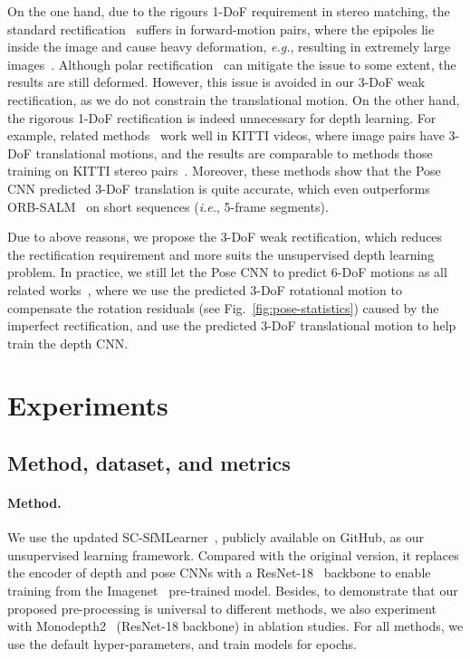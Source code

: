 \documentclass{article}
\newcommand{\figref}[1]{Fig.~\ref{#1}}
\def\eg{\emph{e.g.}}
\def\ie{\emph{i.e.}}
\begin{document}
On the one hand, due to the rigours 1-DoF requirement in stereo matching,
the standard rectification~\cite{fusiello2000compact} suffers in forward-motion pairs,
where the epipoles lie inside the image and cause heavy deformation, \eg, resulting in extremely large images~\cite{fusiello2000compact}.
Although polar rectification~\cite{pollefeys1999simple} can mitigate the issue to some extent,
the results are still deformed.
However, this issue is avoided in our 3-DoF weak rectification,
as we do not constrain the translational motion.
On the other hand, the rigorous 1-DoF rectification is indeed unnecessary for depth learning.
For example, related methods~\cite{zhou2017unsupervised,yin2018geonet,ranjan2019cc,monodepth2, bian2019depth} work well in KITTI videos,
where image pairs have 3-DoF translational motions,
and the results are comparable to methods those training on KITTI stereo pairs~\cite{garg2016unsupervised, godard2017unsupervised, zhan2018unsupervised}.
Moreover, these methods show that the Pose CNN predicted 3-DoF translation is quite accurate, which even outperforms ORB-SALM~\cite{mur2015orb} on short sequences (\ie, 5-frame segments).

Due to above reasons, we propose the 3-DoF weak rectification,
which reduces the rectification requirement and more suits the unsupervised depth learning problem.
In practice, we still let the Pose CNN to predict 6-DoF motions as all related works~\cite{zhou2017unsupervised,yin2018geonet,ranjan2019cc,monodepth2, bian2019depth},
where we use the predicted 3-DoF rotational motion to compensate the rotation residuals (see \figref{fig:pose-statistics}) caused by the imperfect rectification,
and use the predicted 3-DoF translational motion to help train the depth CNN.



\section{Experiments}
\label{sec:experiment}

\subsection{Method, dataset, and metrics}

\paragraph{Method.}
We use the updated SC-SfMLearner~\cite{bian2019depth}, publicly available on GitHub, as our unsupervised learning framework.
Compared with the original version, it replaces the encoder of depth and pose CNNs with a ResNet-18~\cite{he2016deep} backbone to enable training from the Imagenet~\cite{imagenet_cvpr09} pre-trained model.
Besides, to demonstrate that our proposed pre-processing is universal to different methods,
we also experiment with Monodepth2~\cite{monodepth2} (ResNet-18 backbone) in ablation studies.
For all methods, we use the default hyper-parameters, and train models for  epochs.
\end{document}
